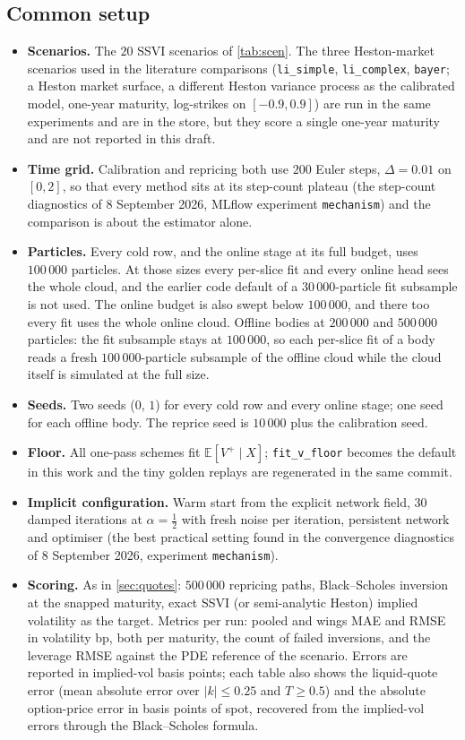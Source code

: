 \documentclass[11pt,a4paper]{article}
\newcommand{\E}{\mathbb{E}}
\newcommand{\code}[1]{\texttt{#1}}
\begin{document}
\subsection{Common setup}\label{sec:suite-setup}

\begin{itemize}
\item \textbf{Scenarios.} The $20$ SSVI scenarios of \cref{tab:scen}. The three Heston-market scenarios used in the literature comparisons (\code{li\_simple}, \code{li\_complex}, \code{bayer}; a Heston market surface, a different Heston variance process as the calibrated model, one-year maturity, log-strikes on $[-0.9,0.9]$) are run in the same experiments and are in the store, but they score a single one-year maturity and are not reported in this draft.
\item \textbf{Time grid.} Calibration and repricing both use $200$ Euler steps, $\Delta=0.01$ on $[0,2]$, so that every method sits at its step-count plateau (the step-count diagnostics of 8 September 2026, MLflow experiment \code{mechanism}) and the comparison is about the estimator alone.
\item \textbf{Particles.} Every cold row, and the online stage at its full budget, uses $100\,000$ particles. At those sizes every per-slice fit and every online head sees the whole cloud, and the earlier code default of a $30\,000$-particle fit subsample is not used. The online budget is also swept below $100\,000$, and there too every fit uses the whole online cloud. Offline bodies at $200\,000$ and $500\,000$ particles: the fit subsample stays at $100\,000$, so each per-slice fit of a body reads a fresh $100\,000$-particle subsample of the offline cloud while the cloud itself is simulated at the full size.
\item \textbf{Seeds.} Two seeds ($0$, $1$) for every cold row and every online stage; one seed for each offline body. The reprice seed is $10\,000$ plus the calibration seed.
\item \textbf{Floor.} All one-pass schemes fit $\E[V^+\mid X]$; \code{fit\_v\_floor} becomes the default in this work and the tiny golden replays are regenerated in the same commit.
\item \textbf{Implicit configuration.} Warm start from the explicit network field, $30$ damped iterations at $\alpha=\tfrac12$ with fresh noise per iteration, persistent network and optimiser (the best practical setting found in the convergence diagnostics of 8 September 2026, experiment \code{mechanism}).
\item \textbf{Scoring.} As in \cref{sec:quotes}: $500\,000$ repricing paths, Black--Scholes inversion at the snapped maturity, exact SSVI (or semi-analytic Heston) implied volatility as the target. Metrics per run: pooled and wings MAE and RMSE in volatility bp, both per maturity, the count of failed inversions, and the leverage RMSE against the PDE reference of the scenario. Errors are reported in implied-vol basis points; each table also shows the liquid-quote error (mean absolute error over $|k|\le0.25$ and $T\ge0.5$) and the absolute option-price error in basis points of spot, recovered from the implied-vol errors through the Black--Scholes formula.

\end{itemize}
\end{document}
